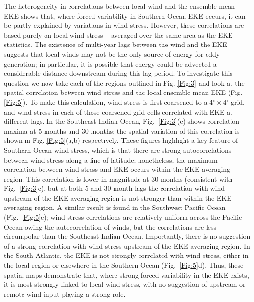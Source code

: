 \documentclass{agujournal2019}
\begin{document}
The heterogeneity in correlations between local wind and the ensemble mean EKE shows that, where forced variability in Southern Ocean EKE occurs, it can be partly explained by variations in wind stress.
However, these correlations are based purely on local wind stress -- averaged over the same area as the EKE statistics.
The existence of multi-year lags between the wind and the EKE suggests that local winds may not be the only source of energy for eddy generation; in particular, it is possible that energy could be advected a considerable distance downstream during this lag period.
To investigate this question we now take each of the regions outlined in Fig. \ref{Fig:3} and look at the spatial correlation between wind stress and the local ensemble mean EKE (Fig. \ref{Fig:5}).
To make this calculation, wind stress is first coarsened to a 4$^\circ \times $4$^\circ$ grid, and wind stress in each of those coarsened grid cells correlated with EKE at different lags.
In the Southeast Indian Ocean, Fig.~\ref{Fig:3}(c) shows correlation maxima at 5 months and 30 months; the spatial variation of this correlation is shown in Fig. \ref{Fig:5}(a,b) respectively.
These figures highlight a key feature of Southern Ocean wind stress, which is that there are strong autocorrelations between wind stress along a line of latitude; nonetheless, the maximum correlation between wind stress and EKE occurs within the EKE-averaging region.
This correlation is lower in magnitude at 30 months (consistent with Fig.~\ref{Fig:3}c), but at both 5 and 30 month lags the correlation with wind upstream of the EKE-averaging region is not stronger than within the EKE-averaging region.
A similar result is found in the Southwest Pacific Ocean (Fig.~\ref{Fig:5}c); wind stress correlations are relatively uniform across the Pacific Ocean owing the autocorrelation of winds, but the correlations are less circumpolar than the Southeast Indian Ocean.
Importantly, there is no suggestion of a strong correlation with wind stress upstream of the EKE-averaging region.
In the South Atlantic, the EKE is not strongly correlated with wind stress, either in the local region or elsewhere in the Southern Ocean (Fig.~\ref{Fig:5}d).
Thus, these spatial maps demonstrate that, where strong forced variability in the EKE exists, it is most strongly linked to local wind stress, with no suggestion of upstream or remote wind input playing a strong role. 
\end{document}
